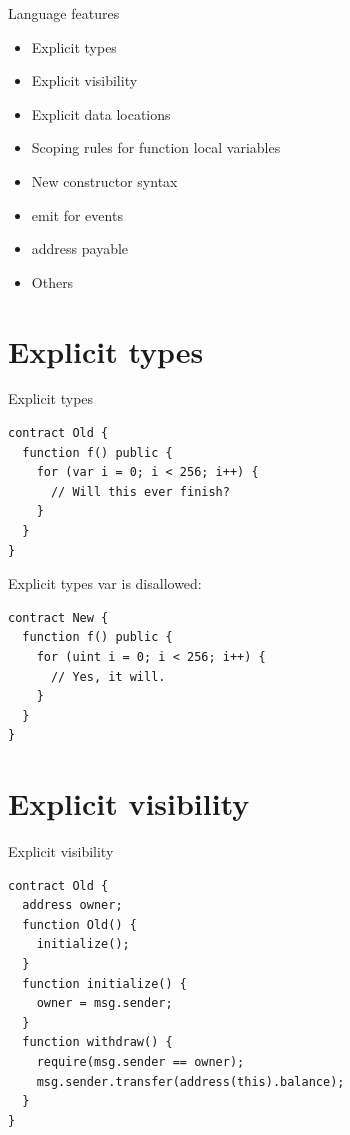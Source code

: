 \documentclass[aspectratio=169,10pt]{beamer}
\begin{document}
\begin{frame}{Language features}
  \begin{itemize}
    \item Explicit types
    \item Explicit visibility
		\item Explicit data locations
    \item Scoping rules for function local variables
    \item New constructor syntax
    \item emit for events
    \item address payable
		\item Others
	\end{itemize}
\end{frame}

\section{Explicit types}

\begin{frame}[fragile]{Explicit types}
  \begin{mdframed}
  \begin{lstlisting}[language=Solidity]
contract Old {
  function f() public {
    for (var i = 0; i < 256; i++) {
      // Will this ever finish?
    }
  }
}
  \end{lstlisting}
  \end{mdframed}
\end{frame}

\begin{frame}[fragile]{Explicit types}
var is disallowed:
\begin{mdframed}
\begin{lstlisting}[language=Solidity]
contract New {
  function f() public {
    for (uint i = 0; i < 256; i++) {
      // Yes, it will.
    }
  }
}
\end{lstlisting}
\end{mdframed}
\end{frame}

\section{Explicit visibility}

\begin{frame}[fragile]{Explicit visibility}
  \begin{mdframed}
    \begin{lstlisting}[language=Solidity]
contract Old {
  address owner;
  function Old() {
    initialize();
  }
  function initialize() {
    owner = msg.sender; 
  }
  function withdraw() {
    require(msg.sender == owner);
    msg.sender.transfer(address(this).balance);
  }
}
    \end{lstlisting}
  \end{mdframed}
\end{frame}
\end{document}
